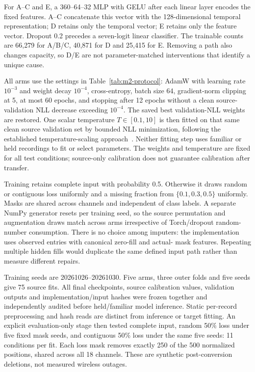 For A--C and E, a 360--64--32 MLP with GELU after each linear layer encodes
the fixed features. A--C concatenate this vector with the 128-dimensional
temporal representation; D retains only the temporal vector; E retains only
the feature vector. Dropout 0.2 precedes a seven-logit linear classifier.
The trainable counts are 66,279 for A/B/C, 40,871 for D and 25,415 for E.
Removing a path also changes capacity, so D/E are not parameter-matched
interventions that identify a unique cause.

All arms use the settings in Table~\ref{tab:m2-protocol}: AdamW with learning
rate $10^{-3}$ and weight decay $10^{-4}$, cross-entropy, batch size 64,
gradient-norm clipping at 5, at most 60 epochs, and stopping after 12 epochs
without a clean source-validation NLL decrease exceeding $10^{-4}$.
The saved best validation-NLL weights are restored. One scalar temperature
$T\in[0.1,10]$ is then fitted on that same clean source validation set by
bounded NLL minimization, following the established temperature-scaling
approach~\cite{guo2017}. Neither fitting step uses familiar or held
recordings to fit or select parameters. The weights and temperature are fixed for all test conditions;
source-only calibration does not guarantee calibration after transfer.

Training retains complete input with probability 0.5. Otherwise it draws
random or contiguous loss uniformly and a missing fraction from
$\{0.1,0.3,0.5\}$ uniformly. Masks are shared across channels and independent
of class labels. A separate NumPy generator resets per training seed, so the
source permutation and augmentation draws match across arms irrespective of
Torch/dropout random-number consumption. There is no choice among imputers:
the implementation uses observed entries with canonical zero-fill and actual-
mask features. Repeating multiple hidden fills would duplicate the same
defined input path rather than measure different repairs.

Training seeds are 20261026--20261030. Five arms, three outer folds and five
seeds give 75 source fits. All final checkpoints, source calibration values,
validation outputs and implementation/input hashes were frozen together and
independently audited before held/familiar model inference. Static per-record
preprocessing and hash reads are distinct from inference or target fitting.
An explicit evaluation-only stage then tested complete input, random 50\%
loss under five fixed mask seeds, and contiguous 50\% loss under the same
five seeds: 11 conditions per fit. Each loss mask removes exactly 250 of the
500 normalized positions, shared across all 18 channels. These are synthetic
post-conversion deletions, not measured wireless outages.

